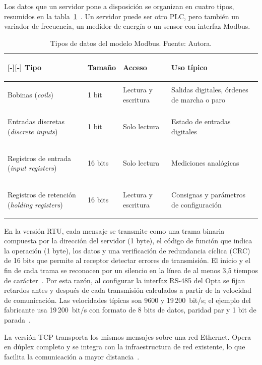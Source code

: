 \documentclass[12pt,a4paper,oneside]{report}
\newcommand{\filacolor}[1]{\rowcolor{#1}[\dimexpr\tabcolsep-\arrayrulewidth\relax][\dimexpr\tabcolsep-\arrayrulewidth\relax]}
\begin{document}
Los datos que un servidor pone a disposición se organizan en cuatro tipos, resumidos en la tabla~\ref{tab:modbus_datos}~\cite{ref32}. Un servidor puede ser otro PLC, pero también un variador de frecuencia, un medidor de energía o un sensor con interfaz Modbus.

\begin{table}[H]
\centering
\caption{Tipos de datos del modelo Modbus. Fuente: Autora.}
\label{tab:modbus_datos}
\renewcommand{\arraystretch}{1.3}
\begin{tabularx}{\textwidth}{|>{\bfseries\raggedright\arraybackslash}p{4.6cm}|p{1.5cm}|>{\raggedright\arraybackslash}p{2.2cm}|>{\raggedright\arraybackslash}X|}
\hline
\filacolor{TableGray}
\textbf{Tipo} & \textbf{Tamaño} & \textbf{Acceso} & \textbf{Uso típico} \\
\hline
Bobinas (\textit{coils}) & 1 bit & Lectura y escritura & Salidas digitales, órdenes de marcha o paro \\
\hline
Entradas discretas (\textit{discrete inputs}) & 1 bit & Solo lectura & Estado de entradas digitales \\
\hline
Registros de entrada (\textit{input registers}) & 16 bits & Solo lectura & Mediciones analógicas \\
\hline
Registros de retención (\textit{holding registers}) & 16 bits & Lectura y escritura & Consignas y parámetros de configuración \\
\hline
\end{tabularx}
\end{table}

En la versión RTU, cada mensaje se transmite como una trama binaria compuesta por la dirección del servidor (1 byte), el código de función que indica la operación (1 byte), los datos y una verificación de redundancia cíclica (CRC) de 16 bits que permite al receptor detectar errores de transmisión. El inicio y el fin de cada trama se reconocen por un silencio en la línea de al menos 3,5 tiempos de carácter~\cite{ref31}. Por esta razón, al configurar la interfaz RS-485 del Opta se fijan retardos antes y después de cada transmisión calculados a partir de la velocidad de comunicación. Las velocidades típicas son 9600 y 19\,200~bit/s; el ejemplo del fabricante usa 19\,200~bit/s con formato de 8 bits de datos, paridad par y 1 bit de parada~\cite{ref30}.

La versión TCP transporta los mismos mensajes sobre una red Ethernet. Opera en dúplex completo y se integra con la infraestructura de red existente, lo que facilita la comunicación a mayor distancia~\cite{ref8}.
\end{document}
